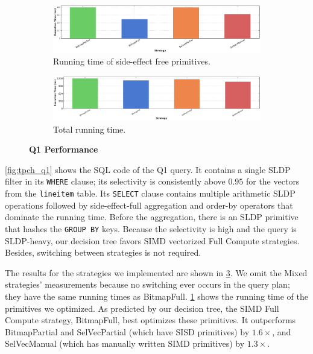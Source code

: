 \documentclass[12pt]{cmuthesis}
\begin{document}
\label{q1section}
\begin{figure}[t!]
\centering
\hspace*{\fill}%
\begin{subfigure}[t]{.8\linewidth}
 \centering
 \includegraphics[width=0.9\linewidth]{eval/q1_optimized.pdf}
 \caption{Running time of side-effect free primitives.} \label{fig:q1_optimized}
\end{subfigure}
\hspace*{\fill}%
\vspace*{8pt}%

\hspace*{\fill}%

\begin{subfigure}[t]{.8\linewidth}
 \centering
 \includegraphics[width=0.9\linewidth]{eval/q1_bench.pdf}
 \caption{Total running time.}
  \label{fig:q1_bench}
\end{subfigure}%
\caption{\textbf{Q1 Performance}}
\label{fig:q1_perf}
\end{figure}

\cref{fig:tpch_q1} shows the SQL code of the Q1 query. It contains a single SLDP filter in its \texttt{WHERE} clause; its selectivity is consistently above $0.95$ for the vectors from the \texttt{lineitem} table. Its \texttt{SELECT} clause contains multiple arithmetic SLDP operations followed by side-effect-full aggregation and order-by operators that dominate the running time. Before the aggregation, there is an SLDP primitive that hashes the \texttt{GROUP BY} keys. Because the selectivity is high and the query is SLDP-heavy, our decision tree favors SIMD vectorized Full Compute strategies. Besides, switching between strategies is not required.

The results for the strategies we implemented are shown in \cref{fig:q1_perf}. We omit the Mixed strategies' measurements because no switching ever occurs in the query plan; they have the same running times as BitmapFull. \cref{fig:q1_optimized} shows the running time of the primitives we optimized. As predicted by our decision tree, the SIMD Full Compute strategy, BitmapFull, best optimizes these primitives. It outperforms BitmapPartial and SelVecPartial (which have SISD primitives) by $1.6\times$, and SelVecManual (which has manually written SIMD primitives) by $1.3\times$. 
\end{document}
